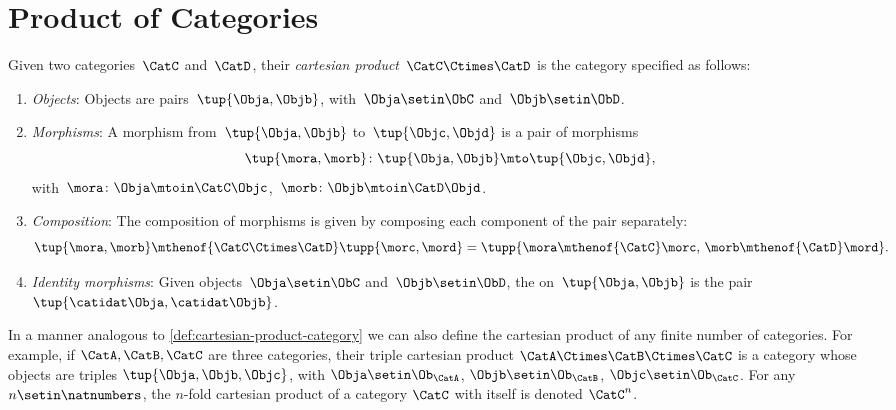 
\section{Product of Categories}

\begin{ctdefinition}
    \label{def:cartesian-product-category}
    Given two categories~$\CatC$ and~$\CatD$, their \emph{cartesian product}~$\CatC \Ctimes \CatD$ is the category specified as follows:
    \begin{enumerate}
        \item \emph{Objects}: Objects are pairs~$\tup{\Obja,\Objb}$, with~$\Obja\setin \ObC$ and~$\Objb\setin \ObD$.
        \item \emph{Morphisms}: A morphism from~$\tup{\Obja, \Objb}$ to~$\tup{\Objc,\Objd}$ is a pair of morphisms
              \begin{equation}\label{eq:prod-cat-morphisms}
                  \tup{\mora,\morb} \colon \tup{\Obja,\Objb}\mto \tup{\Objc,\Objd},
              \end{equation}
              with~$\mora\colon \Obja \mtoin\CatC \Objc$,~$\morb\colon \Objb\mtoin\CatD \Objd$.
        \item \emph{Composition}: The composition of morphisms is given by composing each component of the pair separately:
              \begin{equation}
                  \tup{\mora,\morb}\mthenof{\CatC\Ctimes\CatD} \tupp{\morc,\mord}=\tupp{\mora\mthenof{\CatC}\morc,\, \morb \mthenof{\CatD} \mord}.
              \end{equation}
        \item \emph{Identity morphisms}: Given objects~$\Obja\setin \ObC$ and~$\Objb\setin \ObD$, the  on~$\tup{\Obja,\Objb}$ is the pair $\tup{\catidat\Obja,\catidat\Objb}$.
    \end{enumerate}
\end{ctdefinition}

\begin{remark}\label{rem:n-fold-cart-products-of-cats}
    In a manner analogous to \cref{def:cartesian-product-category} we can also define the cartesian product of any finite number of categories.
    For example, if $\CatA, \CatB, \CatC$ are three categories, their triple cartesian product $\CatA \Ctimes \CatB \Ctimes \CatC$ is a category whose objects are triples $\tup{\Obja, \Objb, \Objc}$, with $\Obja\setin \Ob_\CatA$, $\Objb\setin \Ob_\CatB$, $\Objc\setin \Ob_\CatC$.
    For any $n \setin \natnumbers$, the $n$-fold cartesian product of a category $\CatC$ with itself is denoted $\CatC^n$.
\end{remark}

